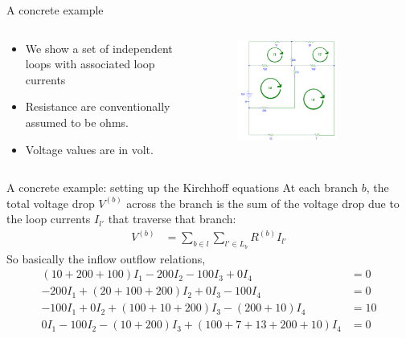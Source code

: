 \documentclass[xcolor=dvipsnames]{beamer}
\begin{document}
\begin{frame}{A concrete example}

   \begin{columns}
        \begin{column}{.45\textwidth}
        \begin{itemize}
        	\item We show a set of independent loops with associated loop currents
        	\item Resistance are conventionally assumed to be ohms.
        	\item Voltage values are in volt.
        \end{itemize}

        \end{column}
		\begin{column}{.65\textwidth}
 	     \begin{figure}[!ht]
  			\centering
    		\includegraphics[width=0.7\textwidth]{concreteEg.png}
    		\label{fig:eg5}
    	 \end{figure}
      	\end{column}
    \end{columns}
\end{frame}

\begin{frame}{A concrete example: setting up the Kirchhoff equations}
At each branch $b$, the total voltage drop $V^{(b)}$ across the branch is the sum of the voltage drop due to the loop currents $I_{l'}$ that traverse that branch:
\begin{align*}
	V^{(b)} &= \sum_{b\in l}\sum_{l'\in L_b} R^{(b)}I_{l'}
\end{align*}
So basically the inflow outflow relations,
\begin{align}\label{eq1}
	(10 + 200 + 100)I_1 - 200 I_2 - 100 I_3 + 0 I_4 &= 0\\
	-200 I_1 + (20 + 100 + 200) I_2 + 0 I_3 - 100 I_4 &= 0\\
	-100 I_1 + 0 I_2 + (100 + 10 + 200)I_3 - (200+10)I_4 &=10\\
	0 I_1 - 100 I_2 - (10+200) I_3 + (100 + 7 + 13 + 200 + 10) I_4 &= 0
\end{align}
\end{frame}
\end{document}

